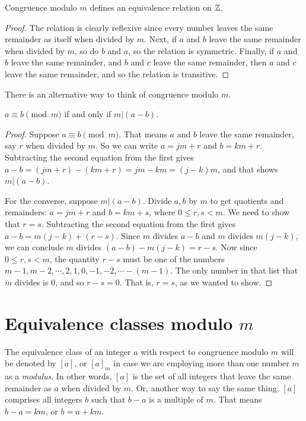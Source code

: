 \begin{thm}
 Congruence modulo $m$ defines an equivalence relation on $\mathbb{Z}$.
\end{thm}
\begin{proof}
The relation is clearly reflexive since every number leaves the same
remainder as itself when divided by $m$. Next, if $a$ and $b$ leave the same remainder 
when divided by $m$, so do $b$ and $a$, so the relation is symmetric. Finally, if
$a$ and $b$ leave the same remainder, and $b$ and $c$ leave the same remainder, then
$a$ and $c$ leave the same remainder, and so the relation is transitive.
\end{proof}

There is an alternative way to think of congruence modulo $m$.

\begin{thm}
 $a\equiv b \pmod m$ if and only if $m | (a-b)$.
\end{thm}
\begin{proof}
Suppose $a\equiv b \pmod m$. That means $a$ and $b$ leave the same 
remainder, say $r$ when divided by $m$. So we can write $a=jm+r$ and $b=km+r$.
Subtracting the second equation from the first gives $a-b = (jm+r)-(km+r)
= jm-km = (j-k)m$, and that shows $m | (a-b)$.

For the converse, suppose $m | (a-b)$. Divide $a,b$ by $m$ to get  quotients and
remainders: $a = jm+r$ and $b=km+s$, where $0\leq r,s<m$. We need to show that
$r=s$. Subtracting the second equation from the first gives
$a-b = m(j-k) + (r-s)$. Since $m$ divides $a-b$ and $m$ divides $m(j-k)$, we can
conclude $m$ divides $(a-b)-m(j-k) = r-s$. Now since $0\leq r,s<m$, the quantity
$r-s$ must be one of the numbers $m-1, m-2,\cdots, 2, 1, 0, -1, -2,\cdots -(m-1)$.
The only number in that list that $m$ divides is $0$, and so $r-s=0$. That is,
$r=s$, as we wanted to show.
\end{proof}

\section{Equivalence classes modulo $m$}
The equivalence class of an integer $a$ with respect to congruence modulo $m$ will be 
denoted
by $\displaystyle[a]$, or $\displaystyle[a]_m$ in case we are employing more than one number $m$ as a \emph{modulus}.
In other words, $[a]$ is the set of all integers that leave the same remainder
as $a$ when divided by $m$. Or, another way to say the same thing, $[a]$ comprises 
all integers $b$ such that $b-a$ is a multiple of $m$. That means $b-a =km$, or
$b=a+km$. 


